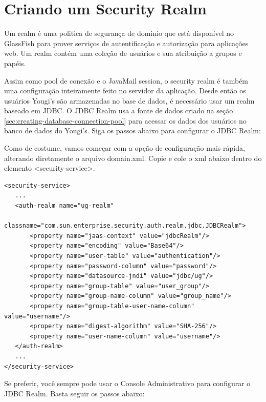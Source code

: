 \documentclass[envcountsame,envcountchap]{svmono}
\begin{document}
\section{Criando um Security Realm}

Um realm é uma politica de segurança de dominio que está disponível no GlassFish para prover serviços de autentificação e autorização para aplicações web. Um realm contém uma coleção de usuários e sua atribuição a grupos e papéis.

Assim como pool de conexão e o JavaMail session, o security realm é também uma configuração inteiramente feito no servidor da aplicação. Desde então os usuários Yougi's são armazenadas no base de dados, é necessário usar um realm baseado em JDBC. O JDBC Realm usa a fonte de dados criado na seção \ref{sec:creating-database-connection-pool} para acessar os dados dos usuários no banco de dados do Yougi's. Siga os passos abaixo para configurar o JDBC Realm:

Como de costume, vamos começar com a opção de configuração mais rápida, alterando diretamente o arquivo domain.xml. Copie e cole o xml abaixo dentro do elemento \textless security-service\textgreater .

\begin{verbatim}
<security-service>
   ...
   <auth-realm name="ug-realm"
       classname="com.sun.enterprise.security.auth.realm.jdbc.JDBCRealm">
       <property name="jaas-context" value="jdbcRealm"/>
       <property name="encoding" value="Base64"/>
       <property name="user-table" value="authentication"/>
       <property name="password-column" value="password"/>
       <property name="datasource-jndi" value="jdbc/ug"/>
       <property name="group-table" value="user_group"/>
       <property name="group-name-column" value="group_name"/>
       <property name="group-table-user-name-column" value="username"/>
       <property name="digest-algorithm" value="SHA-256"/>
       <property name="user-name-column" value="username"/>
   </auth-realm>
   ...
</security-service>
\end{verbatim}

Se preferir, você sempre pode usar o Console Administrativo para configurar o JDBC Realm. Basta seguir os passos abaixo:
\end{document}
